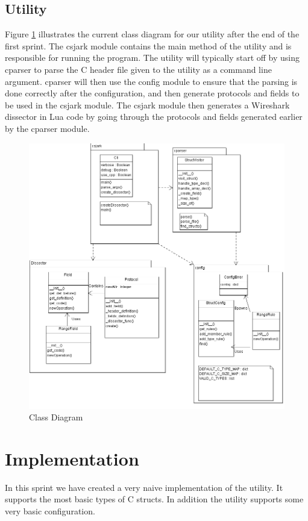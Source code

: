 \subsection{Utility}
Figure \ref{fig:sp1_class} illustrates the current class diagram for our
utility after the end of the first sprint. The csjark module contains the main
method of the utility and is responsible for running the program. The utility
will typically start off by using cparser to parse the C header file given to
the utility as a command line argument. cparser will then use the config module
to ensure that the parsing is done correctly after the configuration, and then
generate protocols and fields to be used in the csjark module. The csjark
module then generates a Wireshark dissector in Lua code by going through the
protocols and fields generated earlier by the cparser module.

\begin{figure}[!htb]
	\center
	\includegraphics[width=\textwidth]{./sprints/img/class_diagram_s1}
	\caption{Class Diagram\label{fig:sp1_class}}
\end{figure}


\section{Implementation}
\label{sec:sp1:impl}
In this sprint we have created a very naive implementation of the utility. It
supports the most basic types of C structs. In addition the utility supports
some very basic configuration.

